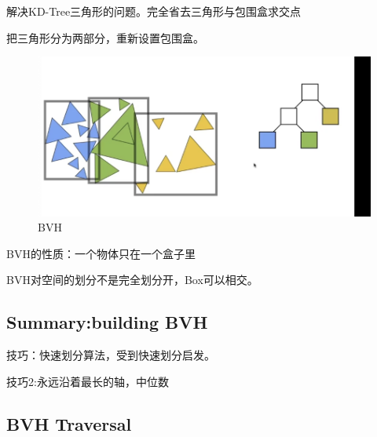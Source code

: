 解决KD-Tree三角形的问题。完全省去三角形与包围盒求交点

把三角形分为两部分，重新设置包围盒。

\begin{figure}[H]
\centering
\includegraphics[scale=0.4]{figures/BVH.png}
\caption{BVH}
\end{figure}

BVH的性质：一个物体只在一个盒子里

BVH对空间的划分不是完全划分开，Box可以相交。

\subsection*{Summary:building BVH}

技巧：快速划分算法，受到快速划分启发。

技巧2:永远沿着最长的轴，中位数

\subsection*{BVH Traversal}




